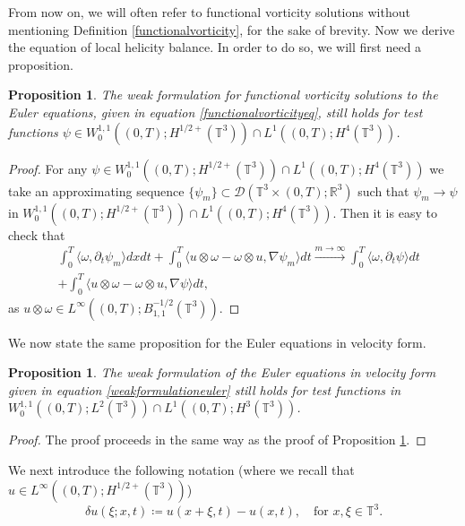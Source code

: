 \documentclass[12pt,a4paper]{article}
\newtheorem{proposition}[theorem]{Proposition}
\theoremstyle{definition}
\theoremstyle{remark}
\numberwithin{equation}{section}
\begin{document}
From now on, we will often refer to functional vorticity solutions without mentioning Definition \ref{functionalvorticity}, for the sake of brevity. Now we derive the equation of local helicity balance. In order to do so, we will first need a proposition.
\begin{proposition} \label{gentestfunctions}
The weak formulation for functional vorticity solutions to the Euler equations, given in equation \eqref{functionalvorticityeq}, still holds for test functions $\psi \in W^{1,1}_0 ((0,T); H^{1/2+} (\mathbb{T}^3)) \cap L^1 ((0,T); H^4 (\mathbb{T}^3))$.
\end{proposition}
\begin{proof}
For any $\psi \in W^{1,1}_0 ((0,T); H^{1/2+} (\mathbb{T}^3)) \cap L^1 ((0,T); H^4 (\mathbb{T}^3))$ we take an approximating sequence $\{ \psi_m \} \subset \mathcal{D} (\mathbb{T}^3 \times (0,T);\mathbb{R}^3)$ such that $\psi_m \rightarrow \psi$ in $W^{1,1}_0 ((0,T); H^{1/2+} (\mathbb{T}^3)) \cap L^1 ((0,T); H^4 (\mathbb{T}^3))$. Then it is easy to check that 
\begin{align*}
&\int_0^T \langle \omega, \partial_t \psi_m \rangle dx dt + \int_0^T \big\langle u \otimes \omega - \omega \otimes u , \nabla \psi_m \big\rangle dt \xrightarrow[]{m \rightarrow \infty} \int_0^T \langle \omega, \partial_t \psi \rangle dt \\
&+ \int_0^T \big\langle u \otimes \omega - \omega \otimes u , \nabla \psi \big\rangle dt,
\end{align*} 
as $u \otimes \omega \in L^\infty ((0,T);B^{-1/2}_{1,1} (\mathbb{T}^3))$.
\end{proof}
We now state the same proposition for the Euler equations in velocity form.
\begin{proposition} \label{gentestfunctions2}
The weak formulation of the Euler equations in velocity form given in equation \eqref{weakformulationeuler} still holds for test functions in $W^{1,1}_0 ((0,T); L^2 (\mathbb{T}^3)) \cap L^1 ((0,T); H^3 (\mathbb{T}^3))$.
\end{proposition}
\begin{proof}
The proof proceeds in the same way as the proof of Proposition \ref{gentestfunctions}.
\end{proof}
We next introduce the following notation (where we recall that $u \in L^\infty ((0,T); H^{1/2+} (\mathbb{T}^3))$)
\begin{equation}
\delta u (\xi;x,t) \coloneqq u ( x + \xi, t) - u (x,t), \quad \text{for } x, \xi \in \mathbb{T}^3. 
\end{equation}
\end{document}
